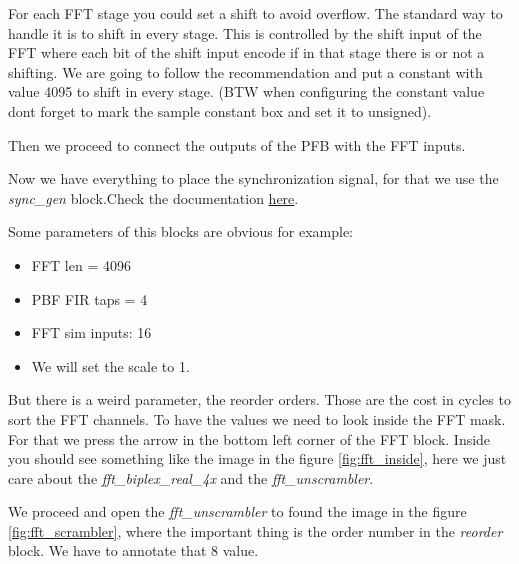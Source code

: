 For each FFT stage you could set a shift to avoid overflow. The standard way to handle it is to shift in every stage. This is controlled by the shift input of the FFT where each bit of the shift input encode if in that stage there is or not a shifting.
We are going to follow the recommendation and put a constant with value 4095 to shift in every stage.
(BTW when configuring the constant value dont forget to mark the sample constant box and set it to unsigned).


Then we proceed to connect the outputs of the PFB with the FFT inputs.


Now we have everything to place the synchronization signal, for that we use the \textit{sync\_gen} block.Check the documentation \href{https://casper-toolflow.readthedocs.io/en/latest/src/blockdocs/Sync_gen.html}{here}. 

Some parameters of this blocks are obvious for example:
\begin{itemize}
    \item FFT len = 4096
    \item PBF FIR taps = 4
    \item FFT sim inputs: 16
    \item We will set the scale to 1. 
\end{itemize}

But there is a weird parameter, the reorder orders. Those are the cost in cycles to sort the FFT channels. To have the values we need to look inside the FFT mask. For that we press the arrow in the bottom left corner of the FFT block. Inside you should see something like the image in the figure \ref{fig:fft_inside}, here we just care about the \textit{fft\_biplex\_real\_4x} and the \textit{fft\_unscrambler}.

We proceed and open the \textit{fft\_unscrambler} to found the image in the figure \ref{fig:fft_scrambler}, where  the important thing is the order number in the \textit{reorder} block. We have to annotate that 8 value.

